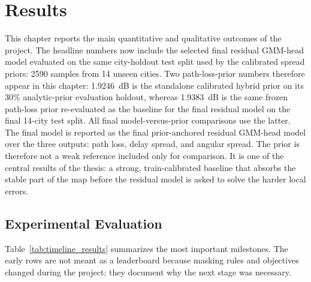 \chapter{Results}
\label{chap:results}

This chapter reports the main quantitative and qualitative outcomes of the
project. The headline numbers now include the selected final residual
GMM-head model evaluated on the same city-holdout test split used by the
calibrated spread priors: 2590 samples from 14 unseen cities. Two
path-loss-prior numbers therefore appear in this chapter: \SI{1.9246}{dB} is
the standalone calibrated hybrid prior on its 30\% analytic-prior evaluation
holdout, whereas \SI{1.9383}{dB} is the same frozen path-loss prior
re-evaluated as the baseline for the final residual model on the final
14-city test split. All final model-versus-prior comparisons use the latter.
The final model is reported as the final prior-anchored residual GMM-head
model over the three outputs: path loss, delay spread, and angular spread.
The prior is therefore not a weak reference included only for comparison. It is
one of the central results of the thesis: a strong, train-calibrated baseline
that absorbs the stable part of the map before the residual model is asked to
solve the harder local errors.

\section{Experimental Evaluation}

Table~\ref{tab:timeline_results} summarizes the most important milestones. The
early rows are not meant as a leaderboard because masking rules and objectives
changed during the project; they document why the next stage was necessary.

